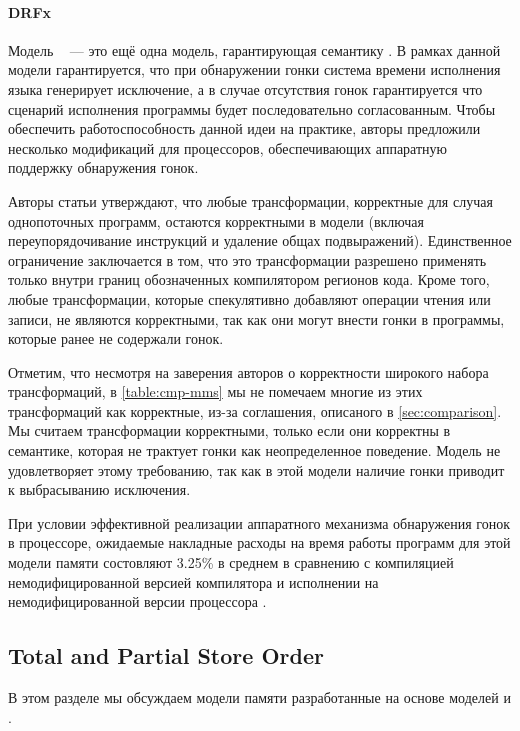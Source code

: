 \paragraph{DRFx}

Модель \DRFx~\cite{Marino-al:PLDI10, Marino-al:TOPLAS2016} --- 
это ещё одна модель, гарантирующая семантику \SC.
В рамках данной модели гарантируется, что 
при обнаружении гонки система времени исполнения языка
генерирует исключение, а в случае отсутствия гонок 
гарантируется что сценарий исполнения программы будет последовательно согласованным.
Чтобы обеспечить работоспособность данной идеи на практике,
авторы предложили несколько модификаций для процессоров, 
обеспечивающих аппаратную поддержку обнаружения гонок.   

Авторы статьи утверждают, что любые трансформации, 
корректные для случая однопоточных программ, 
остаются корректными в модели \DRFx
(включая переупорядочивание инструкций и удаление общах подвыражений).
Единственное ограничение заключается в том, что 
это трансформации разрешено применять только 
внутри границ обозначенных компилятором регионов кода. 
Кроме того, любые трансформации, которые спекулятивно
добавляют операции чтения или записи, 
не являются корректными, 
так как они могут внести гонки в программы, 
которые ранее не содержали гонок.  

Отметим, что несмотря на заверения авторов о корректности широкого набора трансформаций, 
в \cref{table:cmp-mms} мы не помечаем многие из этих трансформаций как корректные, 
из-за соглашения, описаного в \cref{sec:comparison}.
Мы считаем трансформации корректными, только если 
они корректны в семантике, которая не трактует 
гонки как неопределенное поведение. 
Модель \DRFx не удовлетворяет этому требованию, 
так как в этой модели наличие гонки приводит 
к выбрасыванию исключения. 

При условии эффективной реализации 
аппаратного механизма обнаружения гонок в процессоре, 
ожидаемые накладные расходы на время работы программ 
для этой модели памяти состовляют 3.25\% в среднем
в сравнению с компиляцией немодифицированной версией компилятора
и исполнении на немодифицированной версии процессора \Intel.

\subsection{Total and Partial Store Order}

В этом разделе мы обсуждаем модели памяти 
разработанные на основе моделей \TSO и \PSO.

